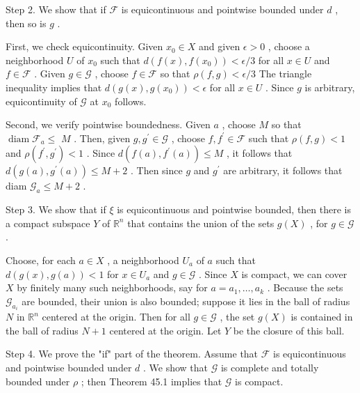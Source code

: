 Step 2. We show that if \(\mathcal{F}\) is equicontinuous and pointwise bounded under \(d\) , then so is \(g\) .

First, we check equicontinuity. Given \({x}_{0} \in  X\) and given \(\epsilon  > 0\) , choose a neighborhood \(U\) of \({x}_{0}\) such that \(d\left( {f\left( x\right) ,f\left( {x}_{0}\right) }\right)  < \epsilon /3\) for all \(x \in  U\) and \(f \in  \mathcal{F}\) . Given \(g \in  \mathcal{G}\) , choose \(f \in  \mathcal{F}\) so that \(\rho \left( {f,g}\right)  < \epsilon /3\) The triangle inequality implies that \(d\left( {g\left( x\right) ,g\left( {x}_{0}\right) }\right)  < \epsilon\) for all \(x \in  U\) . Since \(g\) is arbitrary, equicontinuity of \(\mathcal{G}\) at \({x}_{0}\) follows.

Second, we verify pointwise boundedness. Given \(a\) , choose \(M\) so that \(\operatorname{diam}{\mathcal{F}}_{a} \leq\)  \(M\) . Then, given \(g,{g}^{\prime } \in  \mathcal{G}\) , choose \(f,{f}^{\prime } \in  \mathcal{F}\) such that \(\rho \left( {f,g}\right)  < 1\) and \(\rho \left( {{f}^{\prime },{g}^{\prime }}\right)  < 1\) . Since \(d\left( {f\left( a\right) ,{f}^{\prime }\left( a\right) }\right)  \leq  M\) , it follows that \(d\left( {g\left( a\right) ,{g}^{\prime }\left( a\right) }\right)  \leq  M + 2\) . Then since \(g\) and \({g}^{\prime }\) are arbitrary, it follows that diam \({\mathcal{G}}_{a} \leq  M + 2\) .

Step 3. We show that if \(\xi\) is equicontinuous and pointwise bounded, then there is a compact subspace \(Y\) of \({\mathbb{R}}^{n}\) that contains the union of the sets \(g\left( X\right)\) , for \(g \in  \mathcal{G}\) .

Choose, for each \(a \in  X\) , a neighborhood \({U}_{a}\) of \(a\) such that \(d\left( {g\left( x\right) ,g\left( a\right) }\right)  < 1\) for \(x \in  {U}_{a}\) and \(g \in  \mathcal{G}\) . Since \(X\) is compact, we can cover \(X\) by finitely many such neighborhoods, say for \(a = {a}_{1},\ldots ,{a}_{k}\) . Because the sets \({\mathcal{G}}_{{a}_{i}}\) are bounded, their union is also bounded; suppose it lies in the ball of radius \(N\) in \({\mathbb{R}}^{n}\) centered at the origin. Then for all \(g \in  \mathcal{G}\) , the set \(g\left( X\right)\) is contained in the ball of radius \(N + 1\) centered at the origin. Let \(Y\) be the closure of this ball.

Step 4. We prove the "if" part of the theorem. Assume that \(\mathcal{F}\) is equicontinuous and pointwise bounded under \(d\) . We show that \(\mathcal{G}\) is complete and totally bounded under \(\rho\) ; then Theorem 45.1 implies that \(\mathcal{G}\) is compact.


